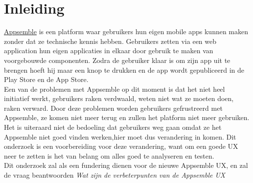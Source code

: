 \chapter{Inleiding}
\href{http:www.appsemble.com}{Appsemble} \cite{appsemble} is een platform waar gebruikers hun eigen mobile apps kunnen maken zonder dat ze technische kennis hebben. Gebruikers zetten via een web application hun eigen applicaties in elkaar door gebruik te maken van voorgebouwde componenten. Zodra de gebruiker klaar is om zijn app uit te brengen hoeft hij maar een knop te drukken en de app wordt gepubliceerd in de Play Store en de App Store.\\
\newline
Een van de problemen met Appsemble op dit moment is dat het niet heel initiatief werkt, gebruikers raken verdwaald, weten niet wat ze moeten doen, raken verward. Door deze problemen worden gebruikers gefrustreerd met Appsemble, ze komen niet meer terug en zullen het platform niet meer gebruiken.\\
\newline
Het is uiteraard niet de bedoeling dat gebruikers weg gaan omdat ze het Appsemble niet goed vinden werken,hier moet dus verandering in komen. Dit onderzoek is een voorbereiding voor deze verandering, want om een goede UX neer te zetten is het van belang om alles goed te analyseren en testen.\\
\newline
Dit onderzoek zal als een fundering dienen voor de nieuwe Appsemble UX, en zal de vraag beantwoorden \emph{Wat zijn de verbeterpunten van de Appsemble UX}\\